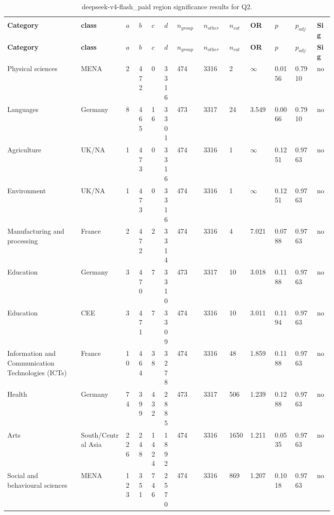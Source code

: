 \begin{longtable}{p{0.18\linewidth}p{0.11\linewidth}p{0.035\linewidth}p{0.035\linewidth}p{0.035\linewidth}p{0.035\linewidth}p{0.045\linewidth}p{0.045\linewidth}p{0.045\linewidth}p{0.06\linewidth}p{0.055\linewidth}p{0.055\linewidth}p{0.04\linewidth}}
\caption{deepseek-v4-flash_paid region significance results for Q2.}\\
\label{tab:appendix-q2-deepseek-v4-flash_paid-region}\\
\scriptsize
\setlength{\tabcolsep}{2pt}
\toprule
\textbf{Category} & \textbf{class} & \textbf{$a$} & \textbf{$b$} & \textbf{$c$} & \textbf{$d$} & \textbf{$n_{group}$} & \textbf{$n_{other}$} & \textbf{$n_{cat}$} & \textbf{OR} & \textbf{$p$} & \textbf{$p_{adj}$} & \textbf{Sig} \\
\midrule
\endfirsthead
\toprule
\textbf{Category} & \textbf{class} & \textbf{$a$} & \textbf{$b$} & \textbf{$c$} & \textbf{$d$} & \textbf{$n_{group}$} & \textbf{$n_{other}$} & \textbf{$n_{cat}$} & \textbf{OR} & \textbf{$p$} & \textbf{$p_{adj}$} & \textbf{Sig} \\
\midrule
\endhead
\midrule
\endfoot
\bottomrule
\endlastfoot
Physical sciences & MENA & 2 & 472 & 0 & 3316 & 474 & 3316 & 2 & $\infty$ & 0.0156 & 0.7910 & no \\
Languages & Germany & 8 & 465 & 16 & 3301 & 473 & 3317 & 24 & 3.549 & 0.0066 & 0.7910 & no \\
Agriculture & UK/NA & 1 & 473 & 0 & 3316 & 474 & 3316 & 1 & $\infty$ & 0.1251 & 0.9763 & no \\
Environment & UK/NA & 1 & 473 & 0 & 3316 & 474 & 3316 & 1 & $\infty$ & 0.1251 & 0.9763 & no \\
Manufacturing and processing & France & 2 & 472 & 2 & 3314 & 474 & 3316 & 4 & 7.021 & 0.0788 & 0.9763 & no \\
Education & Germany & 3 & 470 & 7 & 3310 & 473 & 3317 & 10 & 3.018 & 0.1188 & 0.9763 & no \\
Education & CEE & 3 & 471 & 7 & 3309 & 474 & 3316 & 10 & 3.011 & 0.1194 & 0.9763 & no \\
Information and Communication Technologies (ICTs) & France & 10 & 464 & 38 & 3278 & 474 & 3316 & 48 & 1.859 & 0.1188 & 0.9763 & no \\
Health & Germany & 74 & 399 & 432 & 2885 & 473 & 3317 & 506 & 1.239 & 0.1288 & 0.9763 & no \\
Arts & South/Central Asia & 226 & 248 & 1424 & 1892 & 474 & 3316 & 1650 & 1.211 & 0.0535 & 0.9763 & no \\
Social and behavioural sciences & MENA & 123 & 351 & 746 & 2570 & 474 & 3316 & 869 & 1.207 & 0.1018 & 0.9763 & no \\

\end{longtable}
